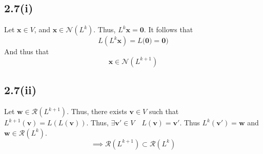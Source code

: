 \documentclass[letterpaper,12pt]{article}
\theoremstyle{definition}
\begin{document}
\subsection*{2.7(i)}
Let $\mathbf{x} \in V$, and $\mathbf{x}  \in \mathscr{N}(L^k)$. Thus, $L^k \mathbf{x}  = \mathbf{0} $. It follows that 
\[L(L^k \mathbf{x} ) = L( \mathbf{0)} = \mathbf{0)} \]
And thus that\[ \mathbf{x} \in \mathscr{N}(L^{k+1})\]

\subsection*{2.7(ii)}
Let $\mathbf{w}  \in \mathscr{R}(L^{k+1})$. Thus, there exists $\mathbf{v} \in V$ such that $L^{k+1}( \mathbf{v} ) = L(L(\mathbf{v} ))$. Thus, $\exists \mathbf{v}' \in V \quad L(\mathbf{v} )= \mathbf{v}'$. Thus $L^k(\mathbf{v}') = \mathbf{w}$ and $\mathbf{w} \in \mathscr{R}(L^k)$.
\[\implies \mathscr{R}(L^{k+1}) \subset \mathscr{R}(L^k)\]
\end{document}
